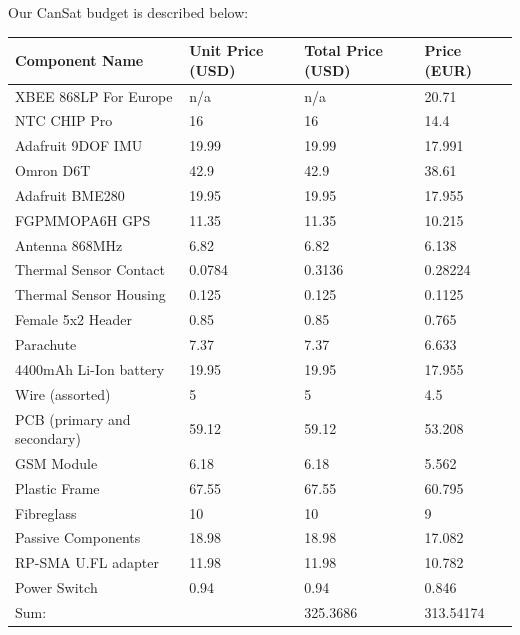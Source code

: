 \documentclass[]{report}
\begin{document}
Our CanSat budget is described below:
\begin{center}
\begin{longtable}{llll}
	Component Name              & Unit Price (USD) & Total Price (USD) & Price (EUR) \\ \hline
	XBEE 868LP For Europe       & n/a              & n/a               & 20.71       \\
	NTC CHIP Pro                & 16               & 16                & 14.4        \\
	Adafruit 9DOF IMU           & 19.99            & 19.99             & 17.991      \\
	Omron D6T                   & 42.9             & 42.9              & 38.61       \\
	Adafruit BME280             & 19.95            & 19.95             & 17.955      \\
	FGPMMOPA6H GPS              & 11.35            & 11.35             & 10.215      \\
	Antenna 868MHz              & 6.82             & 6.82              & 6.138       \\
	Thermal Sensor Contact      & 0.0784           & 0.3136            & 0.28224     \\
	Thermal Sensor Housing      & 0.125            & 0.125             & 0.1125      \\
	Female 5x2 Header           & 0.85             & 0.85              & 0.765       \\
	Parachute                   & 7.37             & 7.37              & 6.633       \\
	4400mAh Li-Ion battery      & 19.95            & 19.95             & 17.955      \\
	Wire (assorted)             & 5                & 5                 & 4.5         \\
	PCB (primary and secondary) & 59.12            & 59.12             & 53.208      \\
	GSM Module                  & 6.18             & 6.18              & 5.562       \\
	Plastic Frame               & 67.55            & 67.55             & 60.795      \\
	Fibreglass                  & 10               & 10                & 9           \\
	Passive Components          & 18.98            & 18.98             & 17.082      \\
	RP-SMA U.FL adapter         & 11.98            & 11.98             & 10.782      \\
	Power Switch                & 0.94             & 0.94              & 0.846       \\ \hline
	Sum:                        &                  & 325.3686          & 313.54174   \\         
\end{longtable}
\end{center}
\end{document}
